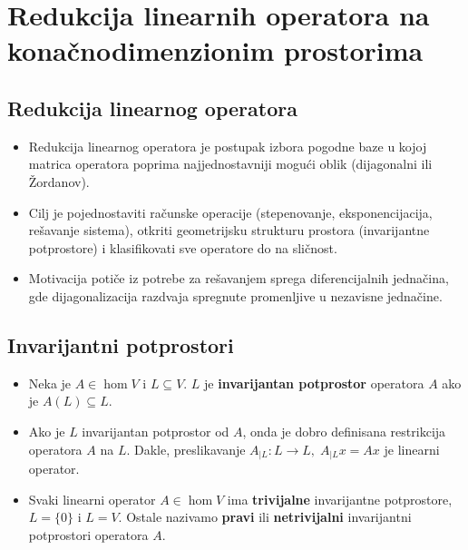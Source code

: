 \documentclass[a4paper,12pt,twoside]{report}
\numberwithin{algorithm}{section}
\begin{document}
\newpage

\section{Redukcija linearnih operatora na konačnodimenzionim prostorima}

\subsection{Redukcija linearnog operatora}
\begin{itemize}
    \item Redukcija linearnog operatora je postupak izbora pogodne baze u kojoj matrica operatora poprima najjednostavniji mogući oblik (dijagonalni ili Žordanov).
    \item Cilj je pojednostaviti računske operacije (stepenovanje, eksponencijacija, rešavanje sistema), otkriti geometrijsku strukturu prostora (invarijantne potprostore) i klasifikovati sve operatore do na sličnost.
    \item Motivacija potiče iz potrebe za rešavanjem sprega diferencijalnih jednačina, gde dijagonalizacija razdvaja spregnute promenljive u nezavisne jednačine.
\end{itemize}

\subsection{Invarijantni potprostori}

\begin{itemize}
    \item Neka je $A \in \hom  V$ i $L \subseteq V$. $L$ je \textbf{invarijantan potprostor} operatora $A$ ako je $A(L) \subseteq L$.
    \item Ako je $L$ invarijantan potprostor od $A$, onda je dobro definisana restrikcija operatora $A$ na $L$. Dakle, preslikavanje $A_{|L}:L \to L, \; A_{|L}x = Ax$ je linearni operator.
    \item Svaki linearni operator $A \in \hom V$ ima \textbf{trivijalne} invarijantne potprostore, \linebreak $L = \{0\}$ i $L = V$. Ostale nazivamo \textbf{pravi} ili \textbf{netrivijalni} invarijantni potprostori operatora $A$.
\end{itemize}
\end{document}
